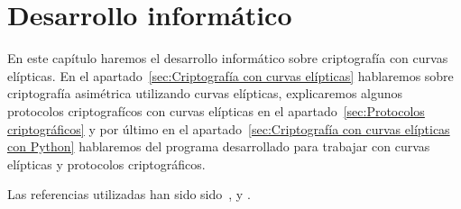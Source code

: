 \chapter{Desarrollo informático}
\label{ch:Desarrollo informático}

En este capítulo haremos el desarrollo informático sobre criptografía con curvas elípticas. En el apartado~\ref{sec:Criptografía con curvas elípticas} hablaremos sobre criptografía asimétrica utilizando curvas elípticas, explicaremos algunos protocolos criptografícos con curvas elípticas en el apartado~\ref{sec:Protocolos criptográficos} y por último en el apartado~\ref{sec:Criptografía con curvas elípticas con Python} hablaremos del programa desarrollado para trabajar con curvas elípticas y protocolos criptográficos.

Las referencias utilizadas han sido sido~\cite{Hankerson:2003}, \cite{Washington:2008} y \cite{Silverman:2009}.




